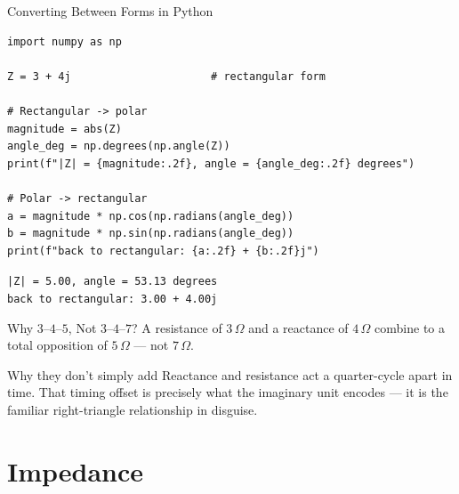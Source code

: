 \documentclass[9pt,aspectratio=169,xcolor=table]{beamer}
\begin{document}
\begin{frame}[fragile]{Converting Between Forms in Python}
    \leavevmode
\begin{lstlisting}
import numpy as np

Z = 3 + 4j                      # rectangular form

# Rectangular -> polar
magnitude = abs(Z)
angle_deg = np.degrees(np.angle(Z))
print(f"|Z| = {magnitude:.2f}, angle = {angle_deg:.2f} degrees")

# Polar -> rectangular
a = magnitude * np.cos(np.radians(angle_deg))
b = magnitude * np.sin(np.radians(angle_deg))
print(f"back to rectangular: {a:.2f} + {b:.2f}j")
\end{lstlisting}
    \texttt{|Z| = 5.00, angle = 53.13 degrees} \\
    \texttt{back to rectangular: 3.00 + 4.00j}
\end{frame}

\begin{frame}{Why $3$--$4$--$5$, Not $3$--$4$--$7$?}
    \leavevmode
    A resistance of $3\,\Omega$ and a reactance of $4\,\Omega$ combine to
    a total opposition of $5\,\Omega$ --- \alert{not} $7\,\Omega$.

    \vspace{3mm}
    \begin{block}{Why they don't simply add}
        Reactance and resistance act a \alert{quarter-cycle apart} in
        time. That timing offset is precisely what the imaginary unit
        encodes --- it is the familiar right-triangle relationship in
        disguise.
    \end{block}
\end{frame}

\section{Impedance}
\end{document}
